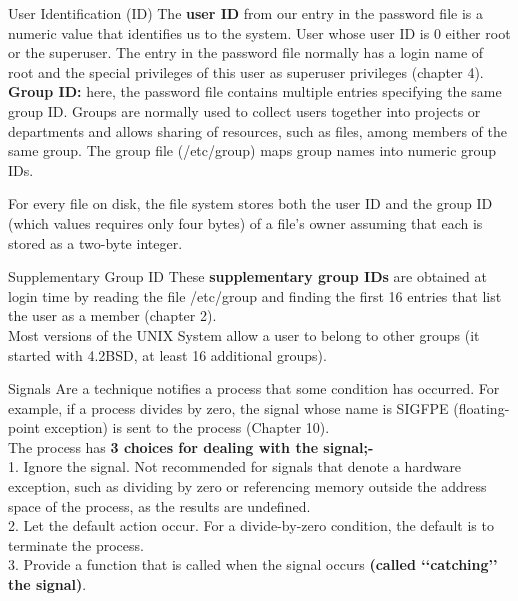 \documentclass[newPxFont,sthlmFooter,nooffset]{beamer}
\begin{document}
\begin{frame}[t]{User Identification (ID)}
The \textbf{user ID} from our entry in the password file is a numeric value that identifies us to the system. 
User whose user ID is 0 either root or the superuser. The entry in the password file normally has a login name of root and the special privileges of this user as superuser privileges (chapter 4).\\[6pt]
\textbf{Group ID:} here, the password file contains multiple entries specifying the same group ID. Groups are normally used to collect users together into projects or departments and allows sharing of resources, such as files, among members of the same group. 
The group file (/etc/group) maps group names into numeric group IDs. 

For every file on disk, the file system stores both the user ID and the group ID (which values requires only four bytes) of a file’s owner assuming that each is stored as a two-byte integer.

\end{frame}
\begin{frame}[t]{Supplementary Group ID}
These \textbf{supplementary group IDs} are obtained at login time by reading the file /etc/group and finding the first 16 entries that list the user as a member (chapter 2).\\[6pt]
Most versions of the UNIX System allow a user to belong to other groups (it started with 4.2BSD, at least 16 additional groups).


\end{frame}
\begin{frame}[t]{Signals}
Are a technique notifies a process that some condition has occurred. For example, if a process divides by zero, the signal whose name is SIGFPE (floating-point exception) is sent to the process (Chapter 10).
\\[6pt]The process has \textbf{3 choices for dealing with the signal;-} 
\\[6pt]1. Ignore the signal. Not recommended for signals that denote a hardware exception, such as dividing by zero or referencing memory outside the address space of the process, as the results are undefined.
\\[6pt]2. Let the default action occur. For a divide-by-zero condition, the default is to terminate the process.
\\[6pt]3. Provide a function that is called when the signal occurs \textbf{(called ‘‘catching’’ the signal)}. 


\end{frame}
\end{document}
